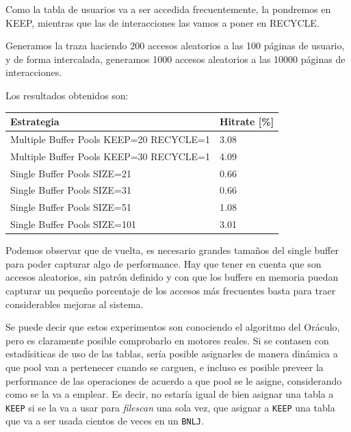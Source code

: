 Como la tabla de usuarios va a ser accedida frecuentemente, la pondremos en KEEP, mientras
que las de interacciones las vamos a poner en RECYCLE.

Generamos la traza haciendo 200 accesos aleatorios a las 100 p\'aginas de usuario, y de forma
intercalada, generamos 1000 accesos aleatorios a las 10000 p\'aginas de interacciones.

Los resultados obtenidos son:

\begin{table}[H]
        \begin{tabular}{l||l}
    \large{\textbf{Estrategia}}                             & \large{\textbf{Hitrate}} [\%] \\
    \hline
                Multiple Buffer Pools KEEP=20 RECYCLE=1 & 3.08   \\
                Multiple Buffer Pools KEEP=30 RECYCLE=1 & 4.09   \\
                Single Buffer Pools SIZE=21             & 0.66   \\
                Single Buffer Pools SIZE=31             & 0.66   \\
                Single Buffer Pools SIZE=51             & 1.08   \\
                Single Buffer Pools SIZE=101            & 3.01   \\
                \end{tabular}
            \end{table}


Podemos observar que de vuelta, es necesario grandes tama\~nos del single buffer para
poder capturar algo de performance. Hay que tener en cuenta que son accesos aleatorios,
sin patr\'on definido y con que los buffers en memoria puedan capturar un peque\~no 
porcentaje de los accesos m\'as frecuentes basta para traer considerables mejoras al sistema.



Se puede decir que estos experimentos son conociendo el algoritmo del Or\'aculo,
pero es claramente posible comprobarlo en motores reales. Si se contasen
con estadísiticas de uso de las tablas, sería posible asignarles de manera
din\'amica a que pool van a pertenecer cuando se carguen, e incluso es
posible preveer la performance de las operaciones de acuerdo a que pool
se le asigne, considerando como se la va a emplear. Es decir, no estaría
igual de bien asignar una tabla a \texttt{KEEP} si se la va a usar para \textit{filescan}
una sola vez, que asignar a \texttt{KEEP} una tabla que va a ser usada cientos de veces
en un \texttt{BNLJ}.
